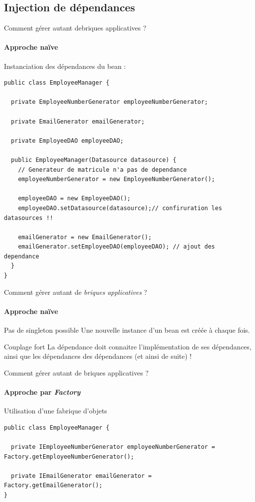 \documentclass[compress]{beamer}%
\begin{document}
\subsection{Injection de dépendances}

\begin{frame}[containsverbatim]{Comment gérer autant debriques applicatives ?}
	\framesubtitle{Approche naïve}
	
	Instanciation des dépendances du bean :
	\begin{lstlisting}
public class EmployeeManager {
	
  private EmployeeNumberGenerator employeeNumberGenerator;		
  
  private EmailGenerator emailGenerator;		
  
  private EmployeeDAO employeeDAO;
		
  public EmployeeManager(Datasource datasource) {
    // Generateur de matricule n'a pas de dependance
    employeeNumberGenerator = new EmployeeNumberGenerator();
			
    employeeDAO = new EmployeeDAO();
    employeeDAO.setDatasource(datasource);// confiruration les datasources !!
			
    emailGenerator = new EmailGenerator();
    emailGenerator.setEmployeeDAO(employeeDAO); // ajout des dependance
  }
}
	\end{lstlisting}
	
\end{frame}

\begin{frame}{Comment gérer autant de \emph{briques applicatives} ?}
	\framesubtitle{Approche naïve}
	
	\begin{alertblock}{Pas de singleton possible}
	Une nouvelle instance d'un bean est créée à chaque fois.
	\end{alertblock}
	
	\pause
	\begin{alertblock}{Couplage fort}
	La dépendance doit connaitre l'implémentation de ses dépendances, ainsi que les dépendances des dépendances (et ainsi de suite) !
	\end{alertblock}
	
\end{frame}

\begin{frame}[containsverbatim]{Comment gérer autant de briques applicatives ?}
	\framesubtitle{Approche par \emph{Factory}}
	
	Utilisation d'une fabrique d'objets
	\begin{lstlisting}
public class EmployeeManager {
	
  private IEmployeeNumberGenerator employeeNumberGenerator = Factory.getEmployeeNumberGenerator();		
  
  private IEmailGenerator emailGenerator = Factory.getEmailGenerator();
}
	\end{lstlisting}
	
	
\end{frame}
\end{document}
